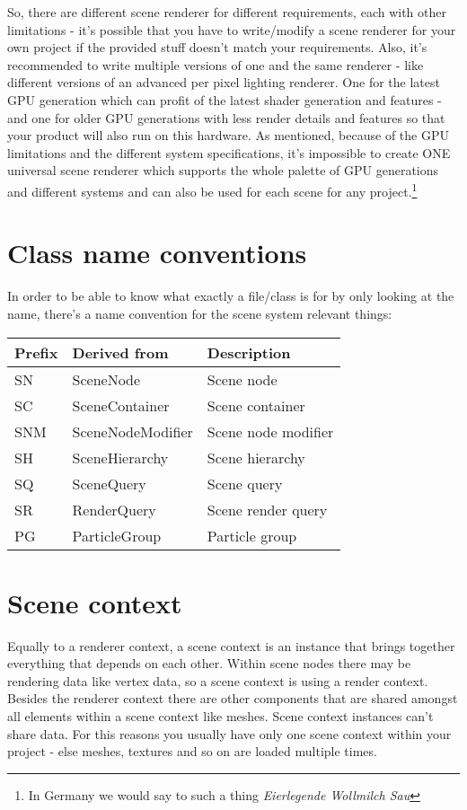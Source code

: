 So, there are different scene renderer for different requirements, each with other limitations - it's possible that you have to write/modify a scene renderer for your own project if the provided stuff doesn't match your requirements. Also, it's recommended to write multiple versions of one and the same renderer - like different versions of an advanced per pixel lighting renderer. One for the latest GPU generation which can profit of the latest shader generation and features - and one for older GPU generations with less render details and features so that your product will also run on this hardware. As mentioned, because of the GPU limitations and the different system specifications, it's impossible to create ONE universal scene renderer which supports the whole palette of GPU generations and different systems and can also be used for each scene for any project.\footnote{In Germany we would say to such a thing \emph{Eierlegende Wollmilch Sau}}




\section{Class name conventions}
In order to be able to know what exactly a file/class is for by only looking at the name, there's a name convention for the scene system relevant things:

\begin{tabular}{|p{2cm}|p{5cm}|p{7cm}|}
\hline
\textbf{Prefix} & \textbf{Derived from} & \textbf{Description}\\
\hline
SN  & SceneNode         & Scene node\\
\hline
SC  & SceneContainer    & Scene container\\
\hline
SNM & SceneNodeModifier & Scene node modifier \\
\hline
SH  & SceneHierarchy    & Scene hierarchy\\
\hline
SQ  & SceneQuery        & Scene query\\
\hline
SR  & RenderQuery       & Scene render query\\
\hline
PG  & ParticleGroup     & Particle group\\
\hline
\end{tabular}




\section{Scene context}
Equally to a renderer context, a scene context is an instance that brings together everything that depends on each other. Within scene nodes there may be rendering data like vertex data, so a scene context is using a render context. Besides the renderer context there are other components that are shared amongst all elements within a scene context like meshes. Scene context instances can't share data. For this reasons you usually have only one scene context within your project - else meshes, textures and so on are loaded multiple times.




